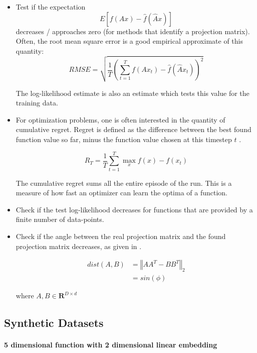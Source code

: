 \begin{itemize}
\item Test if the expectation $$ E[ f(A x) - \hat{f}(\hat{A} x) ] $$ decreases / approaches zero (for methods that identify a projection matrix).
Often, the root mean square error is a good empirical approximate of this quantity:
\begin{equation}
RMSE = \sqrt{ \frac{1}{T} (\sum_{t=1}^{T} f(A x_t) - \hat{f}(\hat{A} x_t))^2 }
\end{equation}

The log-likelihood estimate is also an estimate which tests this value for the training data.

\item For optimization problems, one is often interested in the quantity of cumulative regret.
Regret is defined as the difference between the best found function value so far, minus the function value chosen at this timestep $t$ \citep{RegretDef}.

\begin{equation}
R_T = \frac{1}{T} \sum_{t=1}^{T} \max_x f(x) - f(x_t)
\end{equation}

The cumulative regret sums all the entire episode of the run.
This is a measure of how fast an optimizer can learn the optima of a function.

\item Check if the test log-likelihood decreases for functions that are provided by a finite number of data-points.

\item Check if the angle between the real projection matrix and the found projection matrix decreases, as given in \citep{AngleMeasurement}. 

\begin{align}
dist(A, B) &= \left\Vert A A^T - B B^T\right\Vert_2 \\
& = sin( \phi )
\end{align}

where $ A, B \in \mathbf{R}^{D \times d}  $
\end{itemize}


\subsection{Synthetic Datasets} \label{syntheticFunction}
\paragraph{5 dimensional function with 2 dimensional linear embedding}

